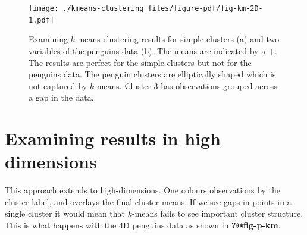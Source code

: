 \documentclass[
  letterpaper,
]{book}
\newenvironment{Shaded}{\begin{snugshade}}{\end{snugshade}}
\newcommand{\AttributeTok}[1]{\textcolor[rgb]{0.40,0.45,0.13}{#1}}
\newcommand{\DecValTok}[1]{\textcolor[rgb]{0.68,0.00,0.00}{#1}}
\newcommand{\FunctionTok}[1]{\textcolor[rgb]{0.28,0.35,0.67}{#1}}
\newcommand{\NormalTok}[1]{\textcolor[rgb]{0.00,0.23,0.31}{#1}}
\newcommand{\OtherTok}[1]{\textcolor[rgb]{0.00,0.23,0.31}{#1}}
\newcommand{\SpecialCharTok}[1]{\textcolor[rgb]{0.37,0.37,0.37}{#1}}
\begin{document}
\begin{figure}[H]

{\centering \texttt{[image: ./kmeans-clustering\_files/figure-pdf/fig-km-2D-1.pdf]}

}

\caption{\label{fig-km-2D}Examining \(k\)-means clustering results for
simple clusters (a) and two variables of the penguins data (b). The
means are indicated by a \(+\). The results are perfect for the simple
clusters but not for the penguins data. The penguin clusters are
elliptically shaped which is not captured by \(k\)-means. Cluster 3 has
observations grouped across a gap in the data.}

\end{figure}

\hypertarget{examining-results-in-high-dimensions}{%
\section{Examining results in high
dimensions}\label{examining-results-in-high-dimensions}}

This approach extends to high-dimensions. One colours observations by
the cluster label, and overlays the final cluster means. If we see gaps
in points in a single cluster it would mean that \(k\)-means fails to
see important cluster structure. This is what happens with the 4D
penguins data as shown in \textbf{?@fig-p-km}.

\begin{Shaded}
\end{Shaded}
\end{document}
